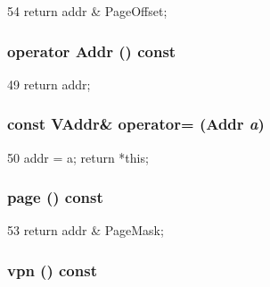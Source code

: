 \begin{DoxyCode}
54 { return addr & PageOffset; }
\end{DoxyCode}
\hypertarget{structAlphaISA_1_1VAddr_acb58a2b913b1ee45cf52ff8a6f5297c5}{
\subsubsection[{operator Addr}]{\setlength{\rightskip}{0pt plus 5cm}operator {\bf Addr} () const}}
\label{structAlphaISA_1_1VAddr_acb58a2b913b1ee45cf52ff8a6f5297c5}



\begin{DoxyCode}
49 { return addr; }
\end{DoxyCode}
\hypertarget{structAlphaISA_1_1VAddr_a7a4215209d20e18c277206574eb1a86e}{
\subsubsection[{operator=}]{\setlength{\rightskip}{0pt plus 5cm}const {\bf VAddr}\& operator= ({\bf Addr} {\em a})}}
\label{structAlphaISA_1_1VAddr_a7a4215209d20e18c277206574eb1a86e}



\begin{DoxyCode}
50 { addr = a; return *this; }
\end{DoxyCode}
\hypertarget{structAlphaISA_1_1VAddr_a0a2c0c43cd466cb2730c9387a7061a2b}{
\subsubsection[{page}]{ page () const}}
\label{structAlphaISA_1_1VAddr_a0a2c0c43cd466cb2730c9387a7061a2b}



\begin{DoxyCode}
53 { return addr & PageMask; }
\end{DoxyCode}
\hypertarget{structAlphaISA_1_1VAddr_ab81a86f36291439a60bf57c10ae767f4}{
\subsubsection[{vpn}]{ vpn () const}}
\label{structAlphaISA_1_1VAddr_ab81a86f36291439a60bf57c10ae767f4}



